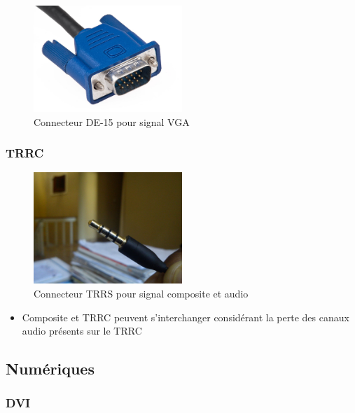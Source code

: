 \documentclass[
  french,
]{book}
\providecommand{\tightlist}{%
  \setlength{\itemsep}{0pt}\setlength{\parskip}{0pt}}
\begin{document}
\begin{figure}
\centering
\includegraphics[width=0.5\textwidth,height=\textheight]{medias/lexique/signaux/analogue/vga.jpg}
\caption{Connecteur DE-15 pour signal VGA}
\end{figure}

\hypertarget{trrc}{%
\subsubsection{TRRC}\label{trrc}}

\begin{figure}
\centering
\includegraphics[width=0.5\textwidth,height=\textheight]{medias/lexique/signaux/analogue/3_5mm.jpg}
\caption{Connecteur TRRS pour signal composite et audio}
\end{figure}

\begin{itemize}
\tightlist
\item
  Composite et TRRC peuvent s'interchanger considérant la perte des canaux audio présents sur le TRRC
\end{itemize}

\hypertarget{numuxe9riques}{%
\subsection{Numériques}\label{numuxe9riques}}

\hypertarget{dvi}{%
\subsubsection{DVI}\label{dvi}}
\end{document}
